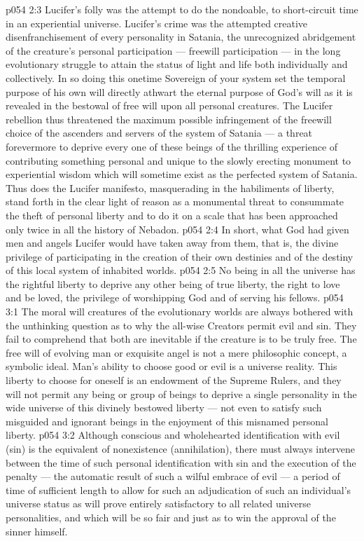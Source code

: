 \vs p054 2:3 \pc Lucifer’s folly was the attempt to do the nondoable, to short\hyp{}circuit time in an experiential universe. Lucifer’s crime was the attempted creative disenfranchisement of every personality in Satania, the unrecognized abridgement of the creature’s personal participation --- freewill participation --- in the long evolutionary struggle to attain the status of light and life both individually and collectively. In so doing this onetime Sovereign of your system set the temporal purpose of his own will directly athwart the eternal purpose of God’s will as it is revealed in the bestowal of free will upon all personal creatures. The Lucifer rebellion thus threatened the maximum possible infringement of the freewill choice of the ascenders and servers of the system of Satania --- a threat forevermore to deprive every one of these beings of the thrilling experience of contributing something personal and unique to the slowly erecting monument to experiential wisdom which will sometime exist as the perfected system of Satania. Thus does the Lucifer manifesto, masquerading in the habiliments of liberty, stand forth in the clear light of reason as a monumental threat to consummate the theft of personal liberty and to do it on a scale that has been approached only twice in all the history of Nebadon.
\vs p054 2:4 In short, what God had given men and angels Lucifer would have taken away from them, that is, the divine privilege of participating in the creation of their own destinies and of the destiny of this local system of inhabited worlds.
\vs p054 2:5 \pc No being in all the universe has the rightful liberty to deprive any other being of true liberty, the right to love and be loved, the privilege of worshipping God and of serving his fellows.
\vs p054 3:1 The moral will creatures of the evolutionary worlds are always bothered with the unthinking question as to why the all\hyp{}wise Creators permit evil and sin. They fail to comprehend that both are inevitable if the creature is to be truly free. The free will of evolving man or exquisite angel is not a mere philosophic concept, a symbolic ideal. Man’s ability to choose good or evil is a universe reality. This liberty to choose for oneself is an endowment of the Supreme Rulers, and they will not permit any being or group of beings to deprive a single personality in the wide universe of this divinely bestowed liberty --- not even to satisfy such misguided and ignorant beings in the enjoyment of this misnamed personal liberty.
\vs p054 3:2 Although conscious and wholehearted identification with evil (sin) is the equivalent of nonexistence (annihilation), there must always intervene between the time of such personal identification with sin and the execution of the penalty --- the automatic result of such a wilful embrace of evil --- a period of time of sufficient length to allow for such an adjudication of such an individual’s universe status as will prove entirely satisfactory to all related universe personalities, and which will be so fair and just as to win the approval of the sinner himself.
